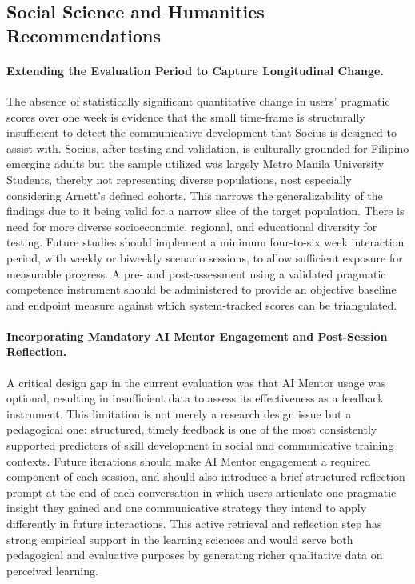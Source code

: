 \subsection{Social Science and Humanities Recommendations}\label{subsec:social-rec}

\paragraph{Extending the Evaluation Period to Capture Longitudinal Change.}

The absence of statistically significant quantitative change in users' pragmatic
scores over one week is evidence that the small time-frame is structurally insufficient to
detect the communicative development that Socius is designed to assist with. Socius, after testing and validation,
is culturally grounded for Filipino emerging adults but the sample utilized was largely Metro Manila University Students, thereby
not representing diverse populations, nost especially considering Arnett's defined cohorts. This narrows the generalizability of the findings due to it being valid for a narrow slice
of the target population. There is need for more diverse socioeconomic, regional, and educational diversity
for testing. Future studies should implement a minimum four-to-six
week interaction period, with weekly or biweekly scenario sessions, to allow
sufficient exposure for measurable progress. A pre- and post-assessment using a
validated pragmatic competence instrument should be administered to provide an objective baseline
and endpoint measure against which system-tracked scores can be triangulated.

\paragraph{Incorporating Mandatory AI Mentor Engagement and Post-Session Reflection.}

A critical design gap in the current evaluation was that AI Mentor usage was
optional, resulting in insufficient data to assess its effectiveness as a feedback
instrument. This limitation is not merely a research design issue but a pedagogical
one: structured, timely feedback is one of the most consistently supported
predictors of skill development in social and communicative training contexts.
Future iterations should make AI Mentor engagement a required component of each
session, and should also introduce a brief structured reflection prompt
at the end of each conversation in which users articulate one pragmatic insight
they gained and one communicative strategy they intend to apply differently in
future interactions. This active retrieval and reflection step has strong empirical
support in the learning sciences and would serve both pedagogical and evaluative
purposes by generating richer qualitative data on perceived learning.

